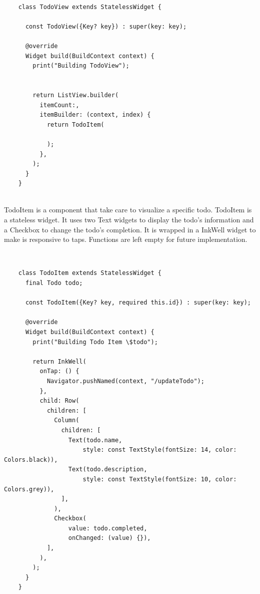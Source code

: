 	\mbox{}\\
	\begin{code}
	 \mbox{}
			\label{code:2.9}
	\begin{verbatim}
	class TodoView extends StatelessWidget {
	
	  const TodoView({Key? key}) : super(key: key);
	
	  @override
	  Widget build(BuildContext context) {
	    print("Building TodoView");
	
	
	    return ListView.builder(
	      itemCount:,
	      itemBuilder: (context, index) {
	        return TodoItem(
	          
	        );
	      },
	    );
	  }
	}
	
	\end{verbatim}
	\end{code}
	\mbox{}
	
	
	TodoItem is a component that take care to visualize a specific todo. TodoItem is a stateless widget. It uses two Text widgets to display the todo's information and a Checkbox to change the todo’s completion. It is wrapped in a InkWell widget to make is responsive to taps. Functions are left empty for future implementation.
	
	\mbox{}\\
	\begin{code}
	 \mbox{}
			\label{code:2.10}
	\begin{verbatim}
	class TodoItem extends StatelessWidget {
	  final Todo todo;
	
	  const TodoItem({Key? key, required this.id}) : super(key: key);
	
	  @override
	  Widget build(BuildContext context) {
	    print("Building Todo Item \$todo");
	
	    return InkWell(
	      onTap: () {
	        Navigator.pushNamed(context, "/updateTodo");
	      },
	      child: Row(
	        children: [
	          Column(
	            children: [
	              Text(todo.name,
	                  style: const TextStyle(fontSize: 14, color: Colors.black)),
	              Text(todo.description,
	                  style: const TextStyle(fontSize: 10, color: Colors.grey)),
	            ],
	          ),
	          Checkbox(
	              value: todo.completed,
	              onChanged: (value) {}),
	        ],
	      ),
	    );
	  }
	}
	
	\end{verbatim}
	\end{code}
	\mbox{}
	
